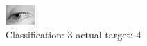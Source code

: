 \begin{figure}[h!]
\begin{center}
\includegraphics[width=0.60\columnwidth]{figures/ID2987_class_3_target_4.png}
\end{center}
\caption{ Classification: 3 actual target: 4}
\label{fig:ID2987_class_3_target_4}
\end{figure}
